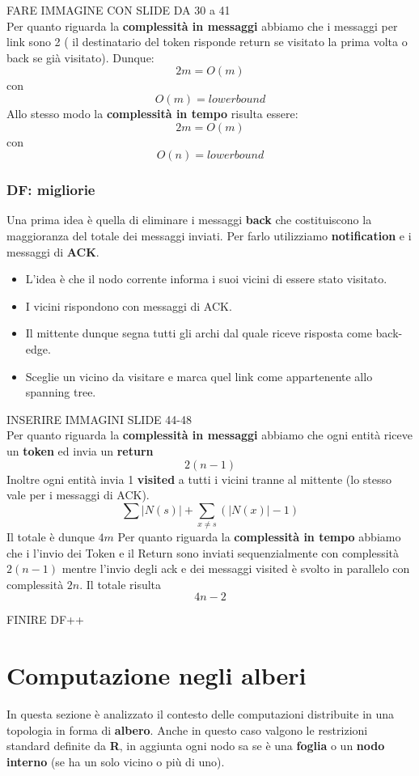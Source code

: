 \documentclass[12pt]{article}
\begin{document}
			FARE IMMAGINE CON SLIDE DA 30 a 41\\
			
			Per quanto riguarda la \textbf{complessità in messaggi} abbiamo che i messaggi per link sono 2 ( il destinatario del token risponde return se visitato la prima volta o back se già visitato). Dunque:
			$$2m = O(m) $$ con $$O(m) = lower bound $$
			Allo stesso modo la \textbf{complessità in tempo} risulta essere: 
			$$2m = O(m) $$ 	con $$O(n) = lower bound $$
		
		\subsubsection{DF: migliorie}
			Una prima idea è quella di eliminare i messaggi \textbf{back} che costituiscono la maggioranza del totale dei messaggi inviati. Per farlo utilizziamo \textbf{notification} e i messaggi di \textbf{ACK}. 
			\begin{itemize}
				\item L'idea è che il nodo corrente informa i suoi vicini di essere stato visitato.
				\item I vicini rispondono con messaggi di ACK. 
				\item Il mittente dunque segna tutti gli archi dal quale riceve risposta come back-edge.
				\item Sceglie un vicino da visitare e marca quel link come appartenente allo spanning tree. 
			\end{itemize}
			
			INSERIRE IMMAGINI SLIDE 44-48\\
			
			Per quanto riguarda la \textbf{complessità in messaggi} abbiamo che ogni entità riceve un \textbf{token} ed invia un \textbf{return} $$2(n-1)$$
			Inoltre ogni entità invia 1 \textbf{visited} a tutti i vicini tranne al mittente (lo stesso vale per i messaggi di ACK).
			$$\sum|N(s)|+\sum_{x\neq s}(|N(x)|-1) $$
			Il totale è dunque $4m $
			Per quanto riguarda la \textbf{complessità in tempo} abbiamo che i l'invio dei Token e il Return sono inviati sequenzialmente con complessità $2(n-1)$ mentre l'invio degli ack e dei messaggi visited è svolto in parallelo con complessità $2n$. Il totale risulta $$4n-2	$$
			
			FINIRE DF++\\
			
\section{Computazione negli alberi}		
	In questa sezione è analizzato il contesto delle computazioni distribuite in una topologia in forma di \textbf{albero}. Anche in questo caso valgono le restrizioni standard definite da \textbf{R}, in aggiunta ogni nodo sa se è una \textbf{foglia} o un \textbf{nodo interno} (se ha un solo vicino o più di uno).
	
\end{document}
